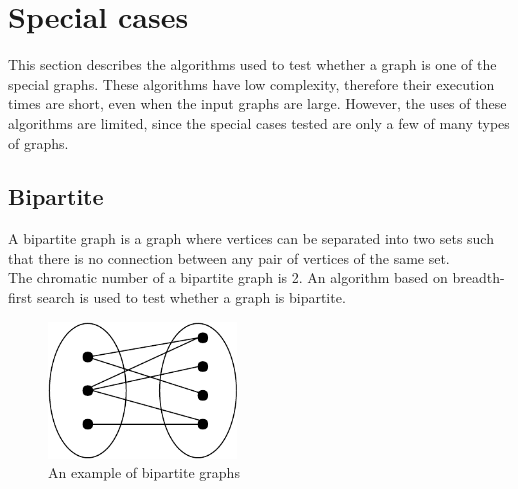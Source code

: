 \documentclass[a4paper]{report}
\begin{document}
		\section{Special cases}
		This section describes the algorithms used to test whether a graph is one of the special graphs. These algorithms have low complexity, therefore their execution times are short, even when the input graphs are large. However, the uses of these algorithms are limited, since the special cases tested are only a few of many types of graphs.
			\subsection{Bipartite}
			A bipartite graph is a graph where vertices can be separated into two sets such that there is no connection between any pair of vertices of the same set.\\
			The chromatic number of a bipartite graph is 2.  An algorithm based on breadth-first search \cite{sedgewick2003}  is used to test whether a graph is bipartite. \\
			
			\begin{figure}[h]
				\centering
				\includegraphics[width=50mm,scale=0.5]{figures/bipartite.pdf}
				\caption{An example of bipartite graphs}
				\label{fig:bipartite}
			\end{figure}
			
\end{document}

